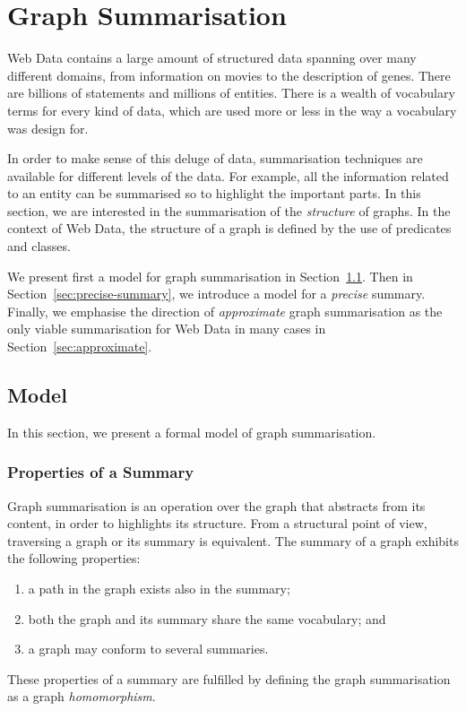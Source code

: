 \section{Graph Summarisation}
\label{chap:summary:model}

Web Data contains a large amount of structured data spanning over many different domains, from information on movies to the description of genes. There are billions of statements and millions of entities. There is a wealth of vocabulary terms for every kind of data, which are used more or less in the way a vocabulary was design for.

In order to make sense of this deluge of data, summarisation techniques are available for different levels of the data. For example, all the information related to an entity can be summarised so to highlight the important parts. In this section, we are interested in the summarisation of the \emph{structure} of graphs. In the context of Web Data, the structure of a graph is defined by the use of predicates and classes.

We present first a model for graph summarisation in Section~\ref{sec:summary:model}. Then in Section~\ref{sec:precise-summary}, we introduce a model for a \emph{precise} summary. Finally, we emphasise the direction of \emph{approximate} graph summarisation as the only viable summarisation for Web Data in many cases in Section~\ref{sec:approximate}.%

\subsection{Model}
\label{sec:summary:model}

In this section, we present a formal model of graph summarisation.

\subsubsection{Properties of a Summary}

Graph summarisation is an operation over the graph that abstracts from its content, in order to highlights its structure. From a structural point of view, traversing a graph or its summary is equivalent. The summary of a graph exhibits the following properties:
\begin{enumerate}
	\item a path in the graph exists also in the summary;
	\label{sprop-path}
	\item both the graph and its summary share the same vocabulary; and
	\label{sprop-voc}
	\item a graph may conform to several summaries.
	\label{sprop-not-uniq}
\end{enumerate}
These properties of a summary are fulfilled by defining the graph summarisation as a graph \emph{homomorphism}.

